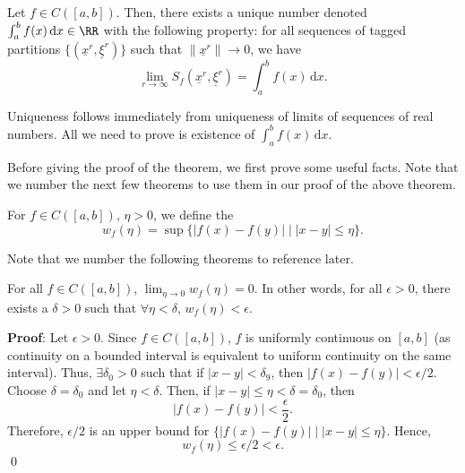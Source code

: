 
\begin{theorem}
Let $f\in C([a,b])$. Then, there exists a unique number denoted $\int_a^b f(x)\,\mathrm dx\in \RR$ with the following property: for all sequences of tagged partitions $\{(\underline{x}^r, \underline{\xi}^r)\}$ such that $\lVert \underline{x}^r\rVert \to 0$, we have 
\[
\lim_{r \to \infty} S_f(\underline{x}^r, \underline{\xi}^r) = \int_a^b f(x) \,\mathrm dx.
\]
\end{theorem}
\begin{remark}
Uniqueness follows immediately from uniqueness of limits of sequences of real numbers. All we need to prove is existence of $\int_a^b f(x) \,\mathrm dx$.
\end{remark}

Before giving the proof of the theorem, we first prove some useful facts. Note that we number the next few theorems to use them in our proof of the above theorem.

\begin{definition}
For $f\in C([a,b])$, $\eta >0$, we define the 
\[
w_f(\eta) = \sup \{|f(x) - f(y)| \mid |x-y| \leq \eta\}.
\]
\end{definition}

\begin{remark}
Note that we number the following theorems to reference later.
\end{remark}

\begin{theorem}[Theorem I]
For all $f\in C([a,b])$, $\lim_{\eta\to 0} w_f(\eta) = 0$. In other words, for all $\epsilon>0$, there exists a $\delta>0$ such that $\forall \eta < \delta$, $w_f(\eta) < \epsilon$.
\end{theorem}
\textbf{Proof}: Let $\epsilon>0$. Since $f\in C([a,b])$, $f$ is uniformly continuous on $[a,b]$ (as continuity on a bounded interval is equivalent to uniform continuity on the same interval). Thus, $\exists \delta_0 >0$ such that if $|x-y| < \delta_9$, then $|f(x)-f(y)|<\epsilon/2$. Choose $\delta = \delta_0$ and let $\eta < \delta$. Then, if $|x-y|\leq \eta < \delta = \delta_0$, then 
\[
|f(x) - f(y)|< \frac{\epsilon}{2}.
\]
Therefore, $\epsilon/2$ is an upper bound for $\{|f(x) - f(y)| \mid |x-y|\leq \eta\}$. Hence, 
\[
w_f (\eta) \leq \epsilon/2 < \epsilon.
\] \qed 

